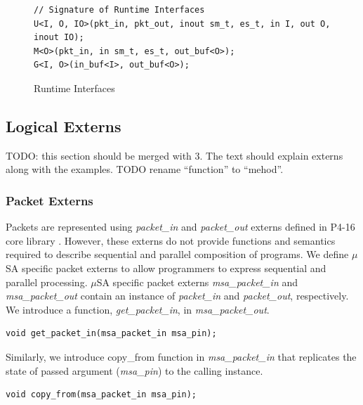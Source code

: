 \documentclass{hotnets19}
\begin{document}
\begin{figure}[!h]
\begin{lstlisting}[frame=none]
// Signature of Runtime Interfaces
U<I, O, IO>(pkt_in, pkt_out, inout sm_t, es_t, in I, out O, inout IO); 
M<O>(pkt_in, in sm_t, es_t, out_buf<O>); 
G<I, O>(in_buf<I>, out_buf<O>); 
\end{lstlisting}
\caption{Runtime Interfaces}
\label{fig:interfaces}
\end{figure}

% 
% 
% 


\subsection{Logical Externs}
\label{subsection:logical-externs}
TODO: this section should be merged with 3. The text should explain externs along with the examples.
TODO rename ``function'' to ``mehod''.
\subsubsection{Packet Externs}
Packets are represented using \emph{packet\-\_in} and \emph{packet\_out} externs defined in P4-16 core library \cite{core.p4}.
However, these externs do not provide functions and semantics required to describe sequential and parallel composition of programs.
We define $\mu$SA specific packet externs to allow programmers to express sequential and parallel processing. 
$\mu$SA specific packet externs \emph{msa\_packet\_in} and \emph{msa\_packet\_out} contain an instance of \emph{packet\_in} and \emph{packet\_out}, respectively.
We introduce a function, \emph{get\-\_packet\-\_in}, in \emph{msa\-\_packet\-\_out}.
\begin{lstlisting}[frame=none]
void get_packet_in(msa_packet_in msa_pin);
\end{lstlisting}
Similarly, we introduce copy\_from function in \emph{msa\_packet\_in} that replicates the state of passed argument (\emph{msa\_pin}) to the calling instance.
\begin{lstlisting}[frame=none]
void copy_from(msa_packet_in msa_pin);
\end{lstlisting}
\end{document}
